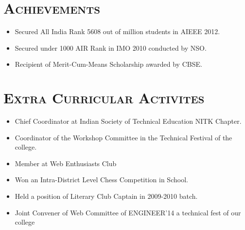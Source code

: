 \begin{resume}

\section{\textsc{Achievements}}

 
\begin{itemize}
\item Secured All India Rank 5608 out of million students in AIEEE 2012.
\item Secured under 1000 AIR Rank in IMO 2010 conducted by NSO.
\item Recipient of Merit-Cum-Means Scholarship awarded by CBSE.
\end{itemize}



\section{\textsc{Extra Curricular Activites}}

\begin{itemize}
\item Chief Coordinator at Indian Society of Technical Education NITK Chapter.
\item Coordinator of the Workshop Committee in the Technical Festival of the college.
\item Member at Web Enthusiasts Club
\item Won an Intra-District Level Chess Competition in School.
\item Held a position of Literary Club Captain in 2009-2010 batch.
\item Joint Convener of Web Committee of ENGINEER'14 a technical fest of our college
\end{itemize}




\end{resume}
